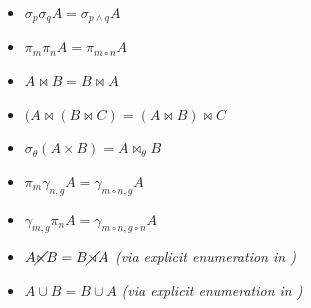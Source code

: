 \begin{itemize}
\item \(\sigma_p \sigma_q A = \sigma_{p \land q} A\)
\item \(\pi_m \pi_{n} A = \pi_{m \circ n} A\)
\item \(A \Join B = B \Join A\)
\item \((A \Join (B \Join C) = (A \Join B) \Join C\)
\item \(\sigma_\theta (A \times B) = A \Join_\theta B\)
\item \(\pi_m \gamma_{n,g} A = \gamma_{m \circ n,g} A \)
\item \(\gamma_{m,g} \pi_n A = \gamma_{m \circ n,g \circ n} A \)
\item \(A \cancel\ltimes B = B \cancel\rtimes A \) \textit{(via explicit enumeration in )}
\item \(A \cup B = B \cup A \) \textit{(via explicit enumeration in )}
\end{itemize}

